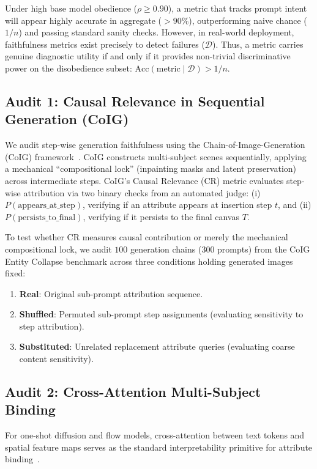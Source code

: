 Under high base model obedience ($\rho \ge 0.90$), a metric that tracks prompt intent will appear highly accurate in aggregate ($>90\%$), outperforming naive chance ($1/n$) and passing standard sanity checks. However, in real-world deployment, faithfulness metrics exist precisely to detect failures ($\mathcal{D}$). Thus, a metric carries genuine diagnostic utility if and only if it provides non-trivial discriminative power on the disobedience subset: $\text{Acc}(\text{metric} \mid \mathcal{D}) > 1/n$.

\subsection{Audit 1: Causal Relevance in Sequential Generation (CoIG)}
\label{sec:method_cr}
We audit step-wise generation faithfulness using the Chain-of-Image-Generation (CoIG) framework~\citep{coig2024}. CoIG constructs multi-subject scenes sequentially, applying a mechanical ``compositional lock'' (inpainting masks and latent preservation) across intermediate steps. CoIG's Causal Relevance (CR) metric evaluates step-wise attribution via two binary checks from an automated judge: (i) $P(\text{appears\_at\_step})$, verifying if an attribute appears at insertion step $t$, and (ii) $P(\text{persists\_to\_final})$, verifying if it persists to the final canvas $T$.

To test whether CR measures causal contribution or merely the mechanical compositional lock, we audit $100$ generation chains ($300$ prompts) from the CoIG Entity Collapse benchmark across three conditions holding generated images fixed:
\begin{enumerate}[leftmargin=*,itemsep=1pt,topsep=1pt]
    \item \textbf{Real}: Original sub-prompt attribution sequence.
    \item \textbf{Shuffled}: Permuted sub-prompt step assignments (evaluating sensitivity to step attribution).
    \item \textbf{Substituted}: Unrelated replacement attribute queries (evaluating coarse content sensitivity).
\end{enumerate}

\subsection{Audit 2: Cross-Attention Multi-Subject Binding}
\label{sec:method_cross_attn}
For one-shot diffusion and flow models, cross-attention between text tokens and spatial feature maps serves as the standard interpretability primitive for attribute binding~\citep{tang2022daam,chefer2023attendandexcite,hertz2022prompttoprompt}. 

